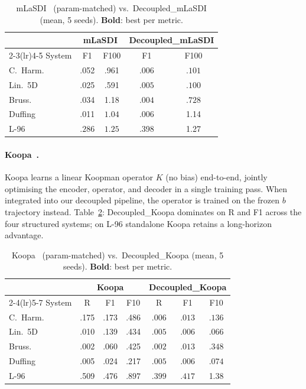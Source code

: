 \documentclass{article}
\begin{document}
\begin{table}[H]
\caption{mLaSDI~\citep{bonneville2024mlasdi} (param-matched) vs.\ Decoupled\_mLaSDI (mean, 5 seeds).
\textbf{Bold}: best per metric.}
\label{tab:mlasdi}
\centering
\small
\begin{tabular}{l cc cc}
\toprule
& \multicolumn{2}{c}{mLaSDI} & \multicolumn{2}{c}{Decoupled\_mLaSDI} \\
\cmidrule(lr){2-3}\cmidrule(lr){4-5}
System & F1 & F100 & F1 & F100 \\
\midrule
C.~Harm.  & .052 & .961 & $\mathbf{.006}$ & $\mathbf{.101}$ \\
Lin.~5D   & .025 & .591 & $\mathbf{.005}$ & $\mathbf{.100}$ \\
Bruss.    & .034 & 1.18 & $\mathbf{.004}$ & $\mathbf{.728}$ \\
Duffing   & .011 & $\mathbf{1.04}$ & $\mathbf{.006}$ & 1.14 \\
L-96      & $\mathbf{.286}$ & $\mathbf{1.25}$ & .398 & 1.27 \\
\bottomrule
\end{tabular}
\end{table}

\paragraph{Koopa~\citep{liu2024koopa}.}
Koopa learns a linear Koopman operator $K$ (no bias) end-to-end,
jointly optimising the encoder, operator, and decoder in a single
training pass.  When integrated into our decoupled pipeline, the
operator is trained on the frozen $b$ trajectory instead.
Table~\ref{tab:koopa}: Decoupled\_Koopa dominates on R and F1 across
the four structured systems; on L-96 standalone Koopa retains a
long-horizon advantage.

\begin{table}[H]
\caption{Koopa~\citep{liu2024koopa} (param-matched) vs.\ Decoupled\_Koopa (mean, 5 seeds).
\textbf{Bold}: best per metric.}
\label{tab:koopa}
\centering
\small
\begin{tabular}{l ccc ccc}
\toprule
& \multicolumn{3}{c}{Koopa} & \multicolumn{3}{c}{Decoupled\_Koopa} \\
\cmidrule(lr){2-4}\cmidrule(lr){5-7}
System & R & F1 & F10 & R & F1 & F10 \\
\midrule
C.~Harm.  & .175 & .173 & .486 & $\mathbf{.006}$ & $\mathbf{.013}$ & $\mathbf{.136}$ \\
Lin.~5D   & .010 & .139 & .434 & $\mathbf{.005}$ & $\mathbf{.006}$ & $\mathbf{.066}$ \\
Bruss.    & .002 & .060 & .425 & $\mathbf{.002}$ & $\mathbf{.013}$ & $\mathbf{.348}$ \\
Duffing   & .005 & .024 & .217 & $\mathbf{.005}$ & $\mathbf{.006}$ & $\mathbf{.074}$ \\
L-96      & .509 & .476 & $\mathbf{.897}$ & $\mathbf{.399}$ & $\mathbf{.417}$ & 1.38 \\
\bottomrule
\end{tabular}
\end{table}
\end{document}
